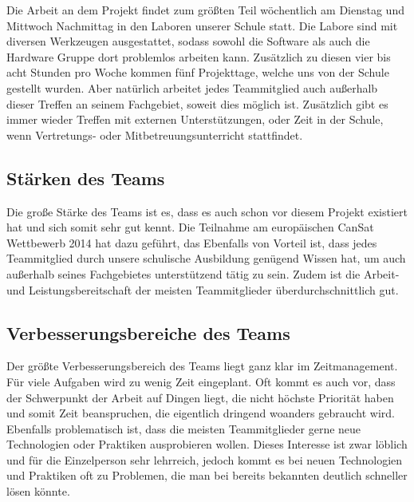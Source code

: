 Die Arbeit an dem Projekt findet zum größten Teil wöchentlich am Dienstag und Mittwoch Nachmittag in den Laboren unserer Schule statt. Die Labore sind mit diversen Werkzeugen ausgestattet, sodass sowohl die Software als auch die Hardware Gruppe dort problemlos arbeiten kann. Zusätzlich zu diesen vier bis acht Stunden pro Woche kommen fünf Projekttage, welche uns von der Schule gestellt wurden. Aber natürlich arbeitet jedes Teammitglied auch außerhalb dieser Treffen an seinem Fachgebiet, soweit dies möglich ist. Zusätzlich gibt es immer wieder Treffen mit externen Unterstützungen, oder Zeit in der Schule, wenn Vertretungs- oder Mitbetreuungsunterricht stattfindet.

\subsection{Stärken des Teams}
Die große Stärke des Teams ist es, dass es auch schon vor diesem Projekt existiert hat und sich somit sehr gut kennt. Die Teilnahme am europäischen CanSat Wettbewerb 2014 hat dazu geführt, das Ebenfalls von Vorteil ist, dass jedes Teammitglied durch unsere schulische Ausbildung genügend Wissen hat, um auch außerhalb seines Fachgebietes unterstützend tätig zu sein. Zudem ist die Arbeit- und Leistungsbereitschaft der meisten Teammitglieder überdurchschnittlich gut.

\subsection{Verbesserungsbereiche des Teams}
Der größte Verbesserungsbereich des Teams liegt ganz klar im Zeitmanagement. Für viele Aufgaben wird zu wenig Zeit eingeplant. Oft kommt es auch vor, dass der Schwerpunkt der Arbeit auf Dingen liegt, die nicht höchste Priorität haben und somit Zeit beanspruchen, die eigentlich dringend woanders gebraucht wird. Ebenfalls problematisch ist, dass die meisten Teammitglieder gerne neue Technologien oder Praktiken ausprobieren wollen. Dieses Interesse ist zwar löblich und für die Einzelperson sehr lehrreich, jedoch kommt es bei neuen Technologien und Praktiken oft zu Problemen, die man bei bereits bekannten deutlich schneller lösen könnte.

